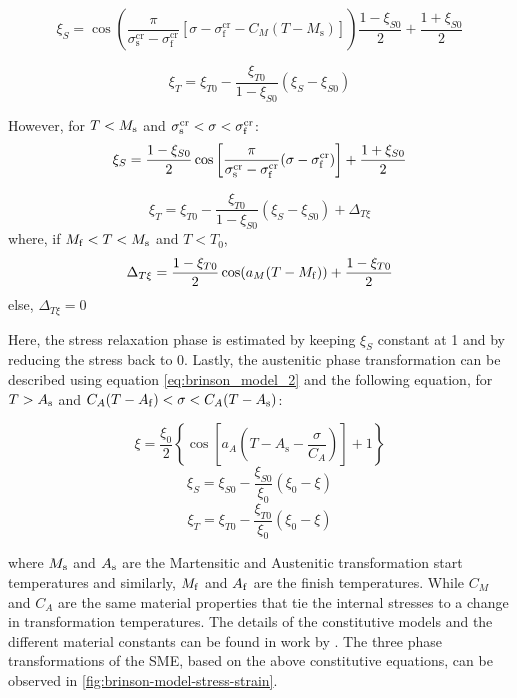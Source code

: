\begin{equation}
  \label{eq:brinson_conv_xis}
  \xi_S = \cos\left(\frac{\pi}{\sigma_\mathrm{s}^\mathrm{cr}-\sigma_\mathrm{f}^\mathrm{cr}}[\sigma - \sigma_\mathrm{f}^\mathrm{cr} - C_M(T-M_\mathrm{s})]\right)\frac{1-\xi_{S0}}{2} + \frac{1+\xi_{S0}}{2}
\end{equation}

\begin{equation}
  \label{eq:brinson_conv_xit}
  \xi_T = \xi_{T0} - \frac{\xi_{T0}}{1-\xi_{S0}}(\xi_S-\xi_{S0})
\end{equation}

However, for $T<M_\mathrm{s}$ and $\sigma_\mathrm{s}^\mathrm{cr}<\sigma<\sigma_\mathrm{f}^\mathrm{cr}$:
\begin{equation}
  \label{eq:brinson_conv_xis1}
  \xi_S = \frac{1-\xi_{S0}}{2}\cos\left[\frac{\pi}{\sigma_\mathrm{s}^\mathrm{cr}-\sigma_\mathrm{f}^\mathrm{cr}}(\sigma - \sigma_\mathrm{f}^\mathrm{cr})\right] + \frac{1+\xi_{S0}}{2}
\end{equation}

\begin{equation}
  \label{eq:brinson_conv_xit2}
  \xi_T = \xi_{T0} - \frac{\xi_{T0}}{1-\xi_{S0}}(\xi_S-\xi_{S0})+\Delta_{T\xi}
\end{equation}
where, if $M_\mathrm{f}<T<M_\mathrm{s}$ and $T<T_0$,
\begin{equation}
  \label{eq:deltaTxi}
  \Delta_{T\xi} = \frac{1-\xi_{T0}}{2}\cos(a_M(T-M_\mathrm{f}))+\frac{1-\xi_{T0}}{2}
\end{equation}
else, $\Delta_{T\xi}=0$

Here, the stress relaxation phase is estimated by keeping $\xi_S$ constant at 1 and by reducing the stress back to 0. Lastly, the austenitic phase transformation can be described using equation \ref{eq:brinson_model_2} and the following equation, for $T>A_\mathrm{s}$ and $C_A(T-A_\mathrm{f})<\sigma<C_A(T-A_\mathrm{s})$:

\begin{equation}
  \label{eq:A_transf}
  \xi = \frac{\xi_0}{2}\left\{\cos\left[a_A\left(T-A_\mathrm{s}-\frac{\sigma}{C_A}\right)\right]+1\right\}
\end{equation}
\begin{equation}
    \label{eq:a-transf_1}
    \xi_S = \xi_{S0} - \frac{\xi_{S0}}{\xi_0}(\xi_0-\xi)
\end{equation}
\begin{equation}
    \label{eq:a-transf_2}
    \xi_T = \xi_{T0} - \frac{\xi_{T0}}{\xi_0}(\xi_0-\xi)
\end{equation}

where $M_\mathrm{s}$ and $A_\mathrm{s}$ are the Martensitic and Austenitic transformation start temperatures and similarly, $M_\mathrm{f}$ and $A_\mathrm{f}$ are the finish temperatures. While $C_M$ and $C_A$ are the same material properties that tie the internal stresses to a change in transformation temperatures. The details of the constitutive models and the different material constants can be found in work by \cite{brinsonOneDimensionalConstitutiveBehavior1993}. The three phase transformations of the SME, based on the above constitutive equations, can be observed in \cref{fig:brinson-model-stress-strain}.

